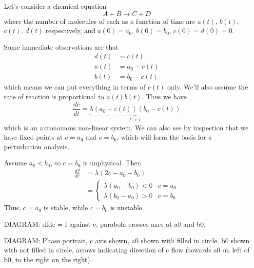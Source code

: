 \documentclass{../template/note}
\begin{document}
    \begin{example}
        Let's consider a chemical equation
        \[
            A + B \to C + D
        \]
        where the number of molecules of each as a function of time are \(a(t)\), \(b(t)\), \(c(t)\), \(d(t)\) respectively, and \(a(0) = a_0\), \(b(0) = b_0\), \(c(0) = d(0) = 0\).

        Some immediate observations are that
        \begin{align*}
            d(t) &= c(t) \\
            a(t) &= a_0 - c(t) \\
            b(t) &= b_0 - c(t)
        \end{align*}
        which means we can put everything in terms of \(c(t)\) only. We'll also assume the rate of reaction is proportional to \(a(t)b(t)\). Thus we have
        \[
            \frac{dc}{dt} = \underbrace{\lambda(a_0-c(t))(b_0-c(t))}_{f(c)}
        \]
        which is an autonomous non-linear system. We can also see by inspection that we have fixed points at \(c = a_0\) and \(c = b_0\), which will form the basis for a perturbation analysis.

        Assume \(a_0 < b_0\), so \(c = b_0\) is unphysical. Then
        \begin{align*}
            \frac{df}{dc} &= \lambda(2c - a_0 - b_0) \\
            &= \begin{cases}
                \lambda(a_0-b_0) < 0 & c = a_0 \\
                \lambda(b_0-a_0) > 0 & c = b_0
            \end{cases}
        \end{align*}
        Thus, \(c = a_0\) is stable, while \(c = b_0\) is unstable.

        DIAGRAM: dfdc = f against c, parabola crosses axes at a0 and b0.

        DIAGRAM: Phase portrait, c axis shown, a0 shown with filled in circle, b0 shown with not filled in circle, arrows indicating direction of c flow (towards a0 on left of b0, to the right on the right).
        
    \end{example}
    
\end{document}
